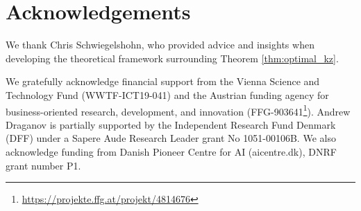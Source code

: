 \section*{Acknowledgements}
We thank Chris Schwiegelshohn, who provided advice and insights when developing the theoretical framework surrounding Theorem \ref{thm:optimal_kz}.

We gratefully acknowledge financial support from the Vienna Science and Technology Fund (WWTF-ICT19-041) and the Austrian funding agency for business-oriented research, development, and innovation (FFG-903641\footnote{\url{https://projekte.ffg.at/projekt/4814676}}). Andrew Draganov is partially supported by the Independent Research Fund Denmark (DFF) under a Sapere Aude Research Leader grant No 1051-00106B. We also acknowledge funding from Danish Pioneer Centre for AI (aicentre.dk), DNRF grant number P1.
